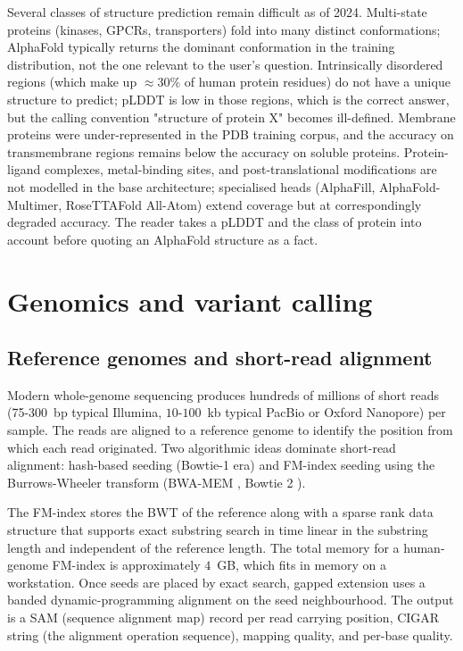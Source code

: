 Several classes of structure prediction remain difficult as of 2024.
Multi-state proteins (kinases, GPCRs, transporters) fold into many
distinct conformations; AlphaFold typically returns the dominant
conformation in the training distribution, not the one relevant to the
user's question. Intrinsically disordered regions (which make up
$\approx 30\%$ of human protein residues) do not have a unique
structure to predict; pLDDT is low in those regions, which is the
correct answer, but the calling convention "structure of protein X"
becomes ill-defined. Membrane proteins were under-represented in the
PDB training corpus, and the accuracy on transmembrane regions remains
below the accuracy on soluble proteins. Protein-ligand complexes,
metal-binding sites, and post-translational modifications are not
modelled in the base architecture; specialised heads (AlphaFill,
AlphaFold-Multimer, RoseTTAFold All-Atom) extend coverage but at
correspondingly degraded accuracy. The reader takes a pLDDT and the
class of protein into account before quoting an AlphaFold structure
as a fact.

\section{Genomics and variant calling}

\subsection{Reference genomes and short-read alignment}

Modern whole-genome sequencing produces hundreds of millions of short
reads (75-300~bp typical Illumina, $10$-$100$~kb typical PacBio or
Oxford Nanopore) per sample. The reads are aligned to a reference
genome to identify the position from which each read originated. Two
algorithmic ideas dominate short-read alignment: hash-based seeding
(Bowtie-1 era) and FM-index seeding using the Burrows-Wheeler
transform (BWA-MEM \cite{paper:v6c11-li-bwa-2009}, Bowtie 2
\cite{paper:v6c11-langmead-bowtie-2012}).

The FM-index stores the BWT of the reference along with a sparse rank
data structure that supports exact substring search in time linear in
the substring length and independent of the reference length. The
total memory for a human-genome FM-index is approximately $4$~GB, which
fits in memory on a workstation. Once seeds are placed by exact
search, gapped extension uses a banded dynamic-programming alignment
on the seed neighbourhood. The output is a SAM (sequence alignment
map) record per read carrying position, CIGAR string (the alignment
operation sequence), mapping quality, and per-base quality.

